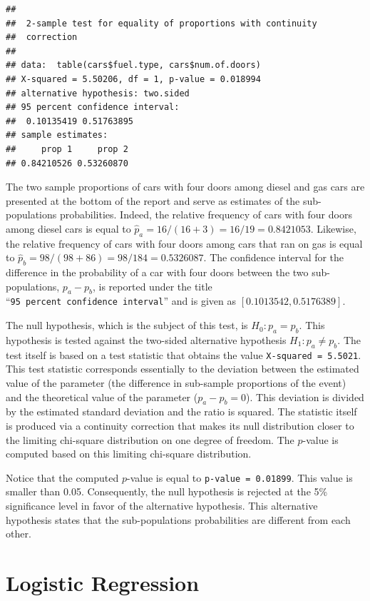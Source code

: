 \documentclass[]{krantz}
\theoremstyle{definition}
\theoremstyle{definition}
\theoremstyle{definition}
\theoremstyle{remark}
\begin{document}
\begin{verbatim}
## 
##  2-sample test for equality of proportions with continuity
##  correction
## 
## data:  table(cars$fuel.type, cars$num.of.doors)
## X-squared = 5.50206, df = 1, p-value = 0.018994
## alternative hypothesis: two.sided
## 95 percent confidence interval:
##  0.10135419 0.51763895
## sample estimates:
##     prop 1     prop 2 
## 0.84210526 0.53260870
\end{verbatim}

The two sample proportions of cars with four doors among diesel and gas
cars are presented at the bottom of the report and serve as estimates of
the sub-populations probabilities. Indeed, the relative frequency of
cars with four doors among diesel cars is equal to
\(\hat p_a = 16/(16+3) = 16/19 = 0.8421053\). Likewise, the relative
frequency of cars with four doors among cars that ran on gas is equal to
\(\hat p_b = 98/(98+86) = 98/184 = 0.5326087\). The confidence interval
for the difference in the probability of a car with four doors between
the two sub-populations, \(p_a - p_b\), is reported under the title
``\texttt{95\ percent\ confidence\ interval}'' and is given as
\([0.1013542, 0.5176389]\).

The null hypothesis, which is the subject of this test, is
\(H_0: p_a = p_b\). This hypothesis is tested against the two-sided
alternative hypothesis \(H_1: p_a \not = p_b\). The test itself is based
on a test statistic that obtains the value \texttt{X-squared\ =\ 5.5021}. This
test statistic corresponds essentially to the deviation between the
estimated value of the parameter (the difference in sub-sample
proportions of the event) and the theoretical value of the parameter
(\(p_a - p_b = 0\)). This deviation is divided by the estimated standard
deviation and the ratio is squared. The statistic itself is produced via
a continuity correction that makes its null distribution closer to the
limiting chi-square distribution on one degree of freedom. The \(p\)-value
is computed based on this limiting chi-square distribution.

Notice that the computed \(p\)-value is equal to \texttt{p-value\ =\ 0.01899}. This
value is smaller than 0.05. Consequently, the null hypothesis is
rejected at the 5\% significance level in favor of the alternative
hypothesis. This alternative hypothesis states that the sub-populations
probabilities are different from each other.

\hypertarget{logistic-regression}{%
\section{Logistic Regression}\label{logistic-regression}}
\end{document}
